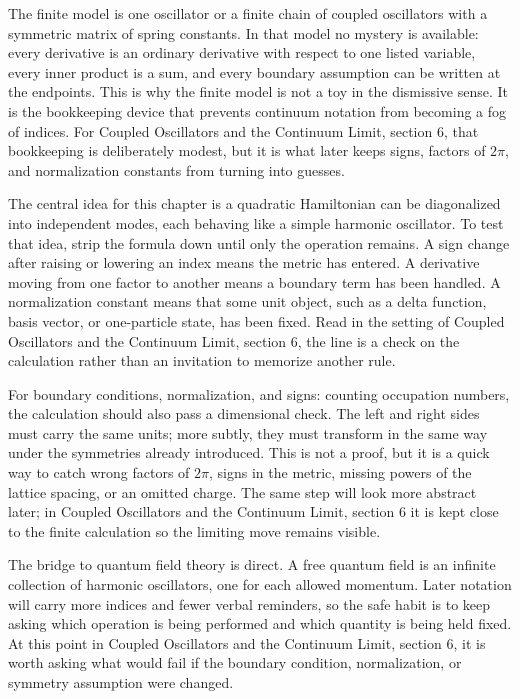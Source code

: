 The finite model is one oscillator or a finite chain of coupled oscillators with a symmetric matrix of spring constants.  In that model no mystery is available: every derivative is an ordinary derivative with respect to one listed variable, every inner product is a sum, and every boundary assumption can be written at the endpoints.  This is why the finite model is not a toy in the dismissive sense.  It is the bookkeeping device that prevents continuum notation from becoming a fog of indices.  For Coupled Oscillators and the Continuum Limit, section 6, that bookkeeping is deliberately modest, but it is what later keeps signs, factors of \(2\pi\), and normalization constants from turning into guesses.

The central idea for this chapter is a quadratic Hamiltonian can be diagonalized into independent modes, each behaving like a simple harmonic oscillator.  To test that idea, strip the formula down until only the operation remains.  A sign change after raising or lowering an index means the metric has entered.  A derivative moving from one factor to another means a boundary term has been handled.  A normalization constant means that some unit object, such as a delta function, basis vector, or one-particle state, has been fixed.  Read in the setting of Coupled Oscillators and the Continuum Limit, section 6, the line is a check on the calculation rather than an invitation to memorize another rule.

For boundary conditions, normalization, and signs: counting occupation numbers, the calculation should also pass a dimensional check.  The left and right sides must carry the same units; more subtly, they must transform in the same way under the symmetries already introduced.  This is not a proof, but it is a quick way to catch wrong factors of \(2\pi\), signs in the metric, missing powers of the lattice spacing, or an omitted charge.  The same step will look more abstract later; in Coupled Oscillators and the Continuum Limit, section 6 it is kept close to the finite calculation so the limiting move remains visible.

The bridge to quantum field theory is direct.  A free quantum field is an infinite collection of harmonic oscillators, one for each allowed momentum.  Later notation will carry more indices and fewer verbal reminders, so the safe habit is to keep asking which operation is being performed and which quantity is being held fixed.  At this point in Coupled Oscillators and the Continuum Limit, section 6, it is worth asking what would fail if the boundary condition, normalization, or symmetry assumption were changed.

